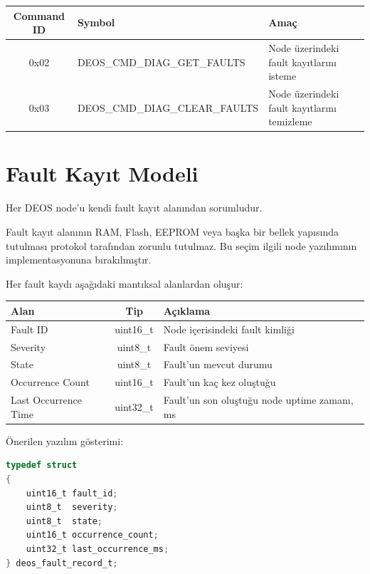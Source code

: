 \documentclass[a4paper,11pt]{article}
\begin{document}
\begin{center}
\begin{tabular}{c l l}
\toprule
\textbf{Command ID} & \textbf{Symbol} & \textbf{Amaç} \\
\midrule
0x02 & DEOS\_CMD\_DIAG\_GET\_FAULTS   & Node üzerindeki fault kayıtlarını isteme \\
0x03 & DEOS\_CMD\_DIAG\_CLEAR\_FAULTS & Node üzerindeki fault kayıtlarını temizleme \\
\bottomrule
\end{tabular}
\end{center}

\section{Fault Kayıt Modeli}

Her DEOS node'u kendi fault kayıt alanından sorumludur.

Fault kayıt alanının RAM, Flash, EEPROM veya başka bir bellek yapısında
tutulması protokol tarafından zorunlu tutulmaz.
Bu seçim ilgili node yazılımının implementasyonuna bırakılmıştır.

Her fault kaydı aşağıdaki mantıksal alanlardan oluşur:

\begin{center}
\begin{tabular}{l c l}
\toprule
\textbf{Alan} & \textbf{Tip} & \textbf{Açıklama} \\
\midrule
Fault ID &
uint16\_t &
Node içerisindeki fault kimliği \\

Severity &
uint8\_t &
Fault önem seviyesi \\

State &
uint8\_t &
Fault'un mevcut durumu \\

Occurrence Count &
uint16\_t &
Fault'un kaç kez oluştuğu \\

Last Occurrence Time &
uint32\_t &
Fault'un son oluştuğu node uptime zamanı, ms \\
\bottomrule
\end{tabular}
\end{center}

Önerilen yazılım gösterimi:

\begin{lstlisting}[language=C]
typedef struct
{
    uint16_t fault_id;
    uint8_t  severity;
    uint8_t  state;
    uint16_t occurrence_count;
    uint32_t last_occurrence_ms;
} deos_fault_record_t;
\end{lstlisting}
\end{document}
